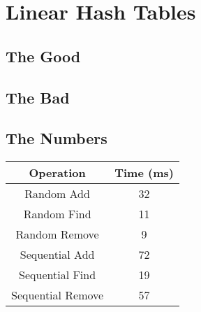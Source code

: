 \documentclass{muformallab}
\begin{document}
  \section{Linear Hash Tables}

  \subsection{The Good}

  \subsection{The Bad}

  \subsection{The Numbers}

  \begin{center}
    \begin{tabular}{c c}
      Operation & Time (ms) \\
      \hline
      Random Add & 32 \\
      Random Find & 11 \\
      Random Remove & 9 \\
      Sequential Add & 72 \\
      Sequential Find & 19 \\
      Sequential Remove & 57 \\
    \end{tabular}
  \end{center}
\end{document}
